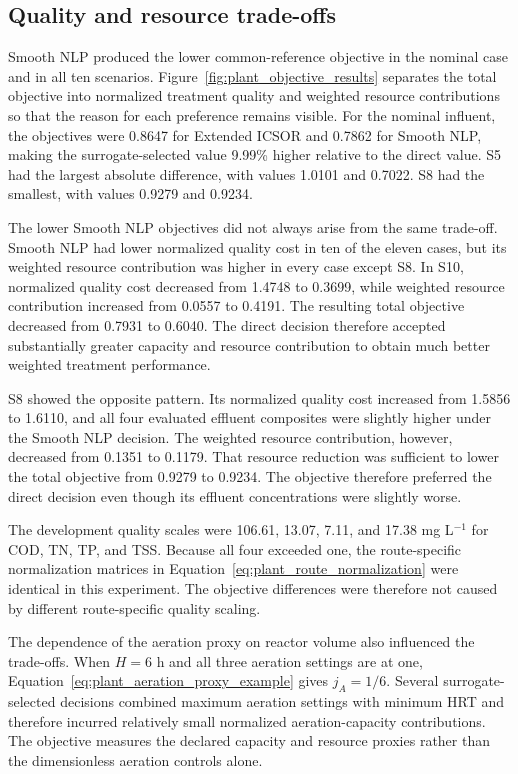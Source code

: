 \subsection{Quality and resource trade-offs}

Smooth NLP produced the lower common-reference objective in the nominal case and in all ten scenarios. Figure~\ref{fig:plant_objective_results} separates the total objective into normalized treatment quality and weighted resource contributions so that the reason for each preference remains visible. For the nominal influent, the objectives were 0.8647 for Extended ICSOR and 0.7862 for Smooth NLP, making the surrogate-selected value 9.99\% higher relative to the direct value. S5 had the largest absolute difference, with values 1.0101 and 0.7022. S8 had the smallest, with values 0.9279 and 0.9234.

The lower Smooth NLP objectives did not always arise from the same trade-off. Smooth NLP had lower normalized quality cost in ten of the eleven cases, but its weighted resource contribution was higher in every case except S8. In S10, normalized quality cost decreased from 1.4748 to 0.3699, while weighted resource contribution increased from 0.0557 to 0.4191. The resulting total objective decreased from 0.7931 to 0.6040. The direct decision therefore accepted substantially greater capacity and resource contribution to obtain much better weighted treatment performance.

S8 showed the opposite pattern. Its normalized quality cost increased from 1.5856 to 1.6110, and all four evaluated effluent composites were slightly higher under the Smooth NLP decision. The weighted resource contribution, however, decreased from 0.1351 to 0.1179. That resource reduction was sufficient to lower the total objective from 0.9279 to 0.9234. The objective therefore preferred the direct decision even though its effluent concentrations were slightly worse.

The development quality scales were 106.61, 13.07, 7.11, and 17.38 mg L$^{-1}$ for COD, TN, TP, and TSS. Because all four exceeded one, the route-specific normalization matrices in Equation~\eqref{eq:plant_route_normalization} were identical in this experiment. The objective differences were therefore not caused by different route-specific quality scaling.

The dependence of the aeration proxy on reactor volume also influenced the trade-offs. When $H=6$ h and all three aeration settings are at one, Equation~\eqref{eq:plant_aeration_proxy_example} gives $j_A=1/6$. Several surrogate-selected decisions combined maximum aeration settings with minimum HRT and therefore incurred relatively small normalized aeration-capacity contributions. The objective measures the declared capacity and resource proxies rather than the dimensionless aeration controls alone.

